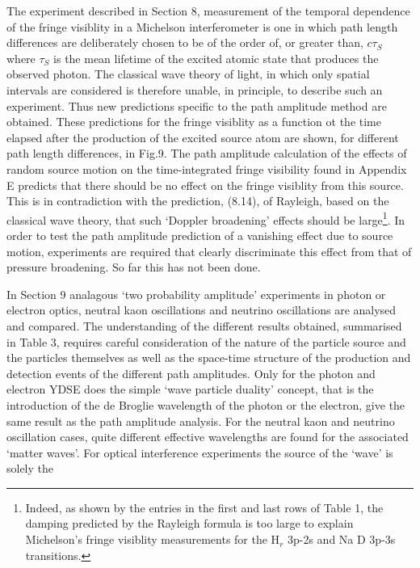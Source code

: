 {  \par The experiment described in Section 8, measurement of the temporal dependence of the
   fringe visiblity in a Michelson interferometer is one in which path length differences
  are deliberately chosen to be of the order of, or greater than, $c \tau_S$ where 
   $\tau_S$ is the mean lifetime of the excited atomic state that produces the observed
  photon. The classical wave theory of light, in which only spatial intervals are considered
  is therefore unable, in principle, to describe such an experiment. Thus new predictions
  specific to the path amplitude method are obtained. These predictions for the fringe visiblity
  as a function ot the time elapsed after the production of the excited source atom are shown,
   for different path length differences, in Fig.9. The path amplitude calculation of the
  effects of random source motion on the time-integrated fringe visibility found in Appendix E predicts
  that there should be no effect on the fringe visiblity from this source. This is in contradiction
  with the prediction, (8.14), of Rayleigh, based on the classical wave theory, that such
  `Doppler broadening' effects should be large\footnote{Indeed, as shown by the entries in the 
   first and last rows of Table 1, the damping predicted by the Rayleigh formula
   is too large to explain Michelson's fringe visiblity measurements for the H$_r$ 3p-2s
    and  Na D 3p-3s transitions.}. In order to test the path amplitude prediction of a
   vanishing effect due
  to source motion, experiments are required that clearly discriminate this effect from
  that of pressure broadening. So far this has not been done.
  \par In Section 9 analagous `two probability amplitude' experiments in photon or electron
  optics, neutral kaon oscillations and neutrino oscillations are analysed and compared. 
  The understanding of the different results obtained, summarised in Table 3, requires 
  careful consideration of the nature of the particle source and the particles 
   themselves as well as the space-time 
  structure of the production and detection events of the different path amplitudes.
  Only for the photon and electron YDSE does the simple
  `wave particle duality' concept, that is the introduction of the de Broglie
   wavelength of the photon or the electron, give the same result as the path 
   amplitude analysis. For the neutral kaon and neutrino oscillation cases, quite
   different effective wavelengths are found for the associated `matter waves'.
   For  optical interference experiments the source of the `wave' is solely the
}
